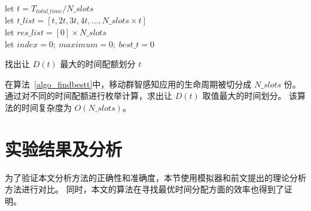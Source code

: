 \begin{algorithm}[h]
\setstretch{\algostretch}
let $t = T_{total\_time}/N\_slots$\\
let $t\_list = [t, 2t, 3t, 4t,\ldots,N\_slots \times t]$\\
let $res\_list = [0] \times N\_slots$\\
let $index = 0;\ maximum = 0;\ best\_t = 0$\\
\caption{找出让 $D(t)$ 最大的时间配额划分 $t$}
\label{algo_findbestt}
\end{algorithm}

在算法~\ref{algo_findbestt}中，移动群智感知应用的生命周期被切分成 $N\_slots$ 份。
通过对不同的时间配额进行枚举计算，求出让 $D(t)$ 取值最大的时间划分。
该算法的时间复杂度为 $O(N\_slots)$。

\section{实验结果及分析}

为了验证本文分析方法的正确性和准确度，本节使用模拟器和前文提出的理论分析方法进行对比。
同时，本文的算法在寻找最优时间分配方面的效率也得到了证明。

